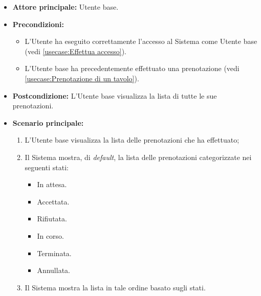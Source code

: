 \label{usecase:Visualizzazione lista delle prenotazioni}
\begin{itemize}
	\item \textbf{Attore principale:} Utente base.

	\item \textbf{Precondizioni:}
	      \begin{itemize}
		      \item L'Utente ha eseguito correttamente l'accesso al Sistema come Utente base (vedi \autoref{usecase:Effettua accesso}).
		      \item L'Utente base ha precedentemente effettuato una prenotazione (vedi \autoref{usecase:Prenotazione di un tavolo}).
	      \end{itemize}


	\item \textbf{Postcondizione:}
	      L'Utente base visualizza la lista di tutte le sue prenotazioni.

	\item \textbf{Scenario principale:}
	      \begin{enumerate}
		      \item L'Utente base visualizza la lista delle prenotazioni che ha effettuato;
		      \item Il Sistema mostra, di \textit{default}, la lista delle prenotazioni categorizzate nei seguenti stati:
		            \begin{itemize}
			            \item In attesa.
			            \item Accettata.
			            \item Rifiutata.
			            \item In corso.
			            \item Terminata.
			            \item Annullata.
		            \end{itemize}
		      \item Il Sistema mostra la lista in tale ordine basato sugli stati.
	      \end{enumerate}
\end{itemize}